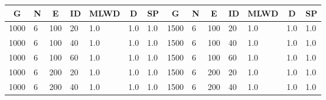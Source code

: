 \begin{table}[H]
\centering
\begin{tabular}{|l|l|l|l|l|l|l|l|l|l|l|l|l|l|}
\hline
\multicolumn{1}{|c|}{G} & \multicolumn{1}{c|}{N} & \multicolumn{1}{c|}{E} & \multicolumn{1}{c|}{ID} & \multicolumn{1}{c|}{MLWD} & \multicolumn{1}{c|}{D} & \multicolumn{1}{c|}{SP} & \multicolumn{1}{c|}{G} & \multicolumn{1}{c|}{N} & \multicolumn{1}{c|}{E} & \multicolumn{1}{c|}{ID} & \multicolumn{1}{c|}{MLWD} & \multicolumn{1}{c|}{D} & \multicolumn{1}{c|}{SP} \\ \hline
1000                    & 6                      & 100                    & 20                      & 1.0                       & 1.0                    & 1.0                     & 1500                   & 6                      & 100                    & 20                      & 1.0                       & 1.0                    & 1.0                     \\ \hline
1000                    & 6                      & 100                    & 40                      & 1.0                       & 1.0                    & 1.0                     & 1500                   & 6                      & 100                    & 40                      & 1.0                       & 1.0                    & 1.0                     \\ \hline
1000                    & 6                      & 100                    & 60                      & 1.0                       & 1.0                    & 1.0                     & 1500                   & 6                      & 100                    & 60                      & 1.0                       & 1.0                    & 1.0                     \\ \hline
1000                    & 6                      & 200                    & 20                      & 1.0                       & 1.0                    & 1.0                     & 1500                   & 6                      & 200                    & 20                      & 1.0                       & 1.0                    & 1.0                     \\ \hline
1000                    & 6                      & 200                    & 40                      & 1.0                       & 1.0                    & 1.0                     & 1500                   & 6                      & 200                    & 40                      & 1.0                       & 1.0                    & 1.0                     \\ \hline

\end{tabular}
\end{table}
